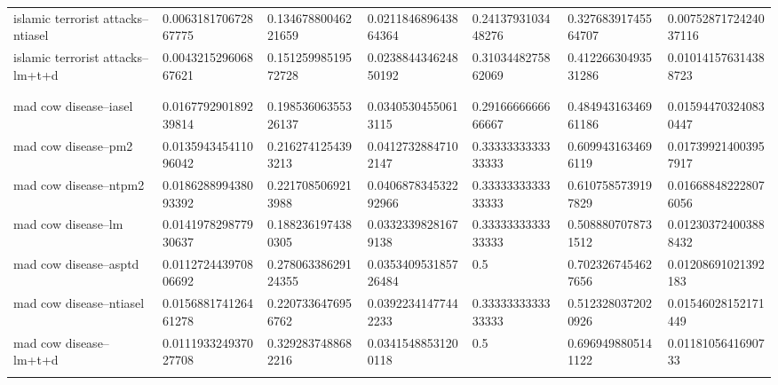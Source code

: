 \begin{table}[h]
\begin{tabular}{lllllll}
islamic terrorist attacks--ntiasel    & 0.006318170672867775  & 0.13467880046221659 & 0.021184689643864364 & 0.2413793103448276  & 0.32768391745564707 & 0.0075287172424037116 \\
islamic terrorist attacks--lm+t+d     & 0.004321529606867621  & 0.15125998519572728 & 0.023884434624850192 & 0.3103448275862069  & 0.41226630493531286 & 0.010141576314388723  \\
                                      &                       &                     &                      &                     &                     &                       \\
                                      &                       &                     &                      &                     &                     &                       \\
mad cow disease--iasel                & 0.016779290189239814  & 0.19853606355326137 & 0.03405304550613115  & 0.2916666666666667  & 0.48494316346961186 & 0.015944703240830447  \\
mad cow disease--pm2                  & 0.013594345411096042  & 0.2162741254393213  & 0.04127328847102147  & 0.3333333333333333  & 0.6099431634696119  & 0.017399214003957917  \\
mad cow disease--ntpm2                & 0.018628899438093392  & 0.2217085069213988  & 0.040687834532292966 & 0.3333333333333333  & 0.6107585739197829  & 0.016688482228076056  \\
mad cow disease--lm                   & 0.014197829877930637  & 0.1882361974380305  & 0.03323398281679138  & 0.3333333333333333  & 0.5088807078731512  & 0.012303724003888432  \\
mad cow disease--asptd                & 0.011272443970806692  & 0.27806338629124355 & 0.035340953185726484 & 0.5                 & 0.7023267454627656  & 0.01208691021392183   \\
mad cow disease--ntiasel              & 0.015688174126461278  & 0.2207336476956762  & 0.03922341477442233  & 0.3333333333333333  & 0.5123280372020926  & 0.01546028152171449   \\
mad cow disease--lm+t+d               & 0.011193324937027708  & 0.3292837488682216  & 0.03415488531200118  & 0.5                 & 0.6969498805141122  & 0.0118105641690733    \\
                                      &                       &                     &                      &                     &                     &                       \\

\end{tabular}
\end{table}
